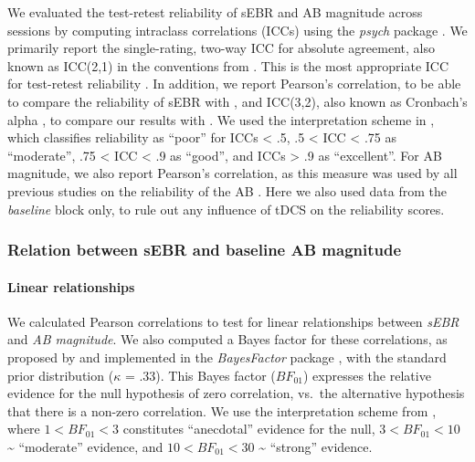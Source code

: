 \documentclass[11pt,english,]{memoir}
\let\oldparagraph\paragraph
\renewcommand{\paragraph}[1]{\oldparagraph{#1}\mbox{}}
\begin{document}
We evaluated the test-retest reliability of sEBR and AB magnitude across sessions by computing intraclass correlations (ICCs) using the \emph{psych} package \autocite[Version NA;][]{R-psych}. We primarily report the single-rating, two-way ICC for absolute agreement, also known as ICC(2,1) in the conventions from \textcite{Shrout1979}. This is the most appropriate ICC for test-retest reliability \autocite{Koo2016}. In addition, we report Pearson's correlation, to be able to compare the reliability of sEBR with \textcite{Dang2017}, and ICC(3,2), also known as Cronbach's alpha \autocite{McGraw1996}, to compare our results with \textcite{Kruis2016}. We used the interpretation scheme in \textcite{Koo2016}, which classifies reliability as ``poor'' for ICCs \textless{} .5, .5 \textless{} ICC \textless{} .75 as ``moderate'', .75 \textless{} ICC \textless{} .9 as ``good'', and ICCs \textgreater{} .9 as ``excellent''. For AB magnitude, we also report Pearson's correlation, as this measure was used by all previous studies on the reliability of the AB \autocite[e.g.][]{Dale2013}. Here we also used data from the \emph{baseline} block only, to rule out any influence of tDCS on the reliability scores.

\hypertarget{AB_sEBR-methods-base}{%
\subsubsection{Relation between sEBR and baseline AB magnitude}\label{AB_sEBR-methods-base}}

\hypertarget{linear-relationships}{%
\paragraph{Linear relationships}\label{linear-relationships}}

We calculated Pearson correlations to test for linear relationships between \emph{sEBR} and \emph{AB magnitude}. We also computed a Bayes factor for these correlations, as proposed by \textcite{Ly2016} and implemented in the \emph{BayesFactor} package \autocite[Version NA;][]{R-BayesFactor}, with the standard prior distribution (\(\kappa\) = .33). This Bayes factor (\(BF_{01}\)) expresses the relative evidence for the null hypothesis of zero correlation, vs.~the alternative hypothesis that there is a non-zero correlation. We use the interpretation scheme from \textcite{Wagenmakers2018}, where \(1 < BF_{01} < 3\) constitutes ``anecdotal'' evidence for the null, \(3 < BF_{01} < 10\) \textasciitilde{} ``moderate'' evidence, and \(10 < BF_{01} < 30\) \textasciitilde{} ``strong'' evidence.
\end{document}
